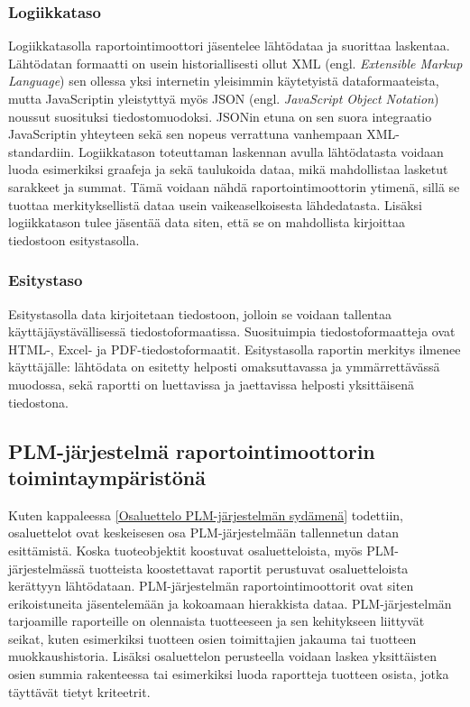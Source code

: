 \subsubsection{Logiikkataso}

Logiikkatasolla raportointimoottori jäsentelee lähtödataa ja suorittaa laskentaa. Lähtödatan formaatti on usein historiallisesti ollut XML (engl. \textit{Extensible Markup Language}) sen ollessa yksi internetin yleisimmin käytetyistä dataformaateista, mutta JavaScriptin yleistyttyä myös JSON (engl. \textit{JavaScript Object Notation}) noussut suosituksi tiedostomuodoksi. JSONin etuna on sen suora integraatio JavaScriptin yhteyteen sekä sen nopeus verrattuna vanhempaan XML-standardiin. \cite{nurseitov_comparison_nodate} Logiikkatason toteuttaman laskennan avulla lähtödatasta voidaan luoda esimerkiksi graafeja ja sekä taulukoida dataa, mikä mahdollistaa lasketut sarakkeet ja summat. Tämä voidaan nähdä raportointimoottorin ytimenä, sillä se tuottaa merkityksellistä dataa usein vaikeaselkoisesta lähdedatasta. Lisäksi logiikkatason tulee jäsentää data siten, että se on mahdollista kirjoittaa tiedostoon esitystasolla.

\subsubsection{Esitystaso}

Esitystasolla data kirjoitetaan tiedostoon, jolloin se voidaan tallentaa käyttäjäystävällisessä tiedostoformaatissa. Suosituimpia tiedostoformaatteja ovat HTML-, Excel- ja PDF-tiedostoformaatit. Esitystasolla raportin merkitys ilmenee käyttäjälle: lähtödata on esitetty helposti omaksuttavassa ja ymmärrettävässä muodossa, sekä raportti on luettavissa ja jaettavissa helposti yksittäisenä tiedostona.

\subsection{PLM-järjestelmä raportointimoottorin toimintaympäristönä}

Kuten kappaleessa \ref{Osaluettelo PLM-järjestelmän sydämenä} todettiin, osaluettelot ovat keskeisesen osa PLM-järjestelmään tallennetun datan esittämistä. Koska tuoteobjektit koostuvat osaluetteloista, myös PLM-järjestelmässä tuotteista koostettavat raportit perustuvat osaluetteloista kerättyyn lähtödataan. PLM-järjestelmän raportointimoottorit ovat siten erikoistuneita jäsentelemään ja kokoamaan hierakkista dataa. PLM-järjestelmän tarjoamille raporteille on olennaista tuotteeseen ja sen kehitykseen liittyvät seikat, kuten esimerkiksi tuotteen osien toimittajien jakauma tai tuotteen muokkaushistoria. Lisäksi osaluettelon perusteella voidaan laskea yksittäisten osien summia rakenteessa tai esimerkiksi luoda raportteja tuotteen osista, jotka täyttävät tietyt kriteetrit.

